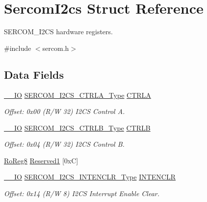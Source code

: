 \hypertarget{struct_sercom_i2cs}{}\section{Sercom\+I2cs Struct Reference}
\label{struct_sercom_i2cs}


S\+E\+R\+C\+O\+M\+\_\+\+I2\+CS hardware registers.  




{\ttfamily \#include $<$sercom.\+h$>$}

\subsection*{Data Fields}
\begin{DoxyCompactItemize}
\item 
\mbox{\hyperlink{core__cm0plus_8h_aec43007d9998a0a0e01faede4133d6be}{\+\_\+\+\_\+\+IO}} \mbox{\hyperlink{union_s_e_r_c_o_m___i2_c_s___c_t_r_l_a___type}{S\+E\+R\+C\+O\+M\+\_\+\+I2\+C\+S\+\_\+\+C\+T\+R\+L\+A\+\_\+\+Type}} \mbox{\hyperlink{struct_sercom_i2cs_a15ba97e28a7ab147edf9ee49ec334a33}{C\+T\+R\+LA}}
\begin{DoxyCompactList}\small\item\em Offset\+: 0x00 (R/W 32) I2\+CS Control A. \end{DoxyCompactList}\item 
\mbox{\hyperlink{core__cm0plus_8h_aec43007d9998a0a0e01faede4133d6be}{\+\_\+\+\_\+\+IO}} \mbox{\hyperlink{union_s_e_r_c_o_m___i2_c_s___c_t_r_l_b___type}{S\+E\+R\+C\+O\+M\+\_\+\+I2\+C\+S\+\_\+\+C\+T\+R\+L\+B\+\_\+\+Type}} \mbox{\hyperlink{struct_sercom_i2cs_ae4cbbc6fff3c083d9c8b46fed1cfe552}{C\+T\+R\+LB}}
\begin{DoxyCompactList}\small\item\em Offset\+: 0x04 (R/W 32) I2\+CS Control B. \end{DoxyCompactList}\item 
\mbox{\hyperlink{group___s_a_m_d21_e15_a__definitions_ga0d957f1433aaf5d70e4dc2b68288442d}{Ro\+Reg8}} \mbox{\hyperlink{struct_sercom_i2cs_a95d7f624017e1390364c8facee43c5a9}{Reserved1}} \mbox{[}0x\+C\mbox{]}
\item 
\mbox{\hyperlink{core__cm0plus_8h_aec43007d9998a0a0e01faede4133d6be}{\+\_\+\+\_\+\+IO}} \mbox{\hyperlink{union_s_e_r_c_o_m___i2_c_s___i_n_t_e_n_c_l_r___type}{S\+E\+R\+C\+O\+M\+\_\+\+I2\+C\+S\+\_\+\+I\+N\+T\+E\+N\+C\+L\+R\+\_\+\+Type}} \mbox{\hyperlink{struct_sercom_i2cs_a4dad9ef715ab90a350196029b86b99c7}{I\+N\+T\+E\+N\+C\+LR}}
\begin{DoxyCompactList}\small\item\em Offset\+: 0x14 (R/W 8) I2\+CS Interrupt Enable Clear. \end{DoxyCompactList}\item 

\end{DoxyCompactItemize}
